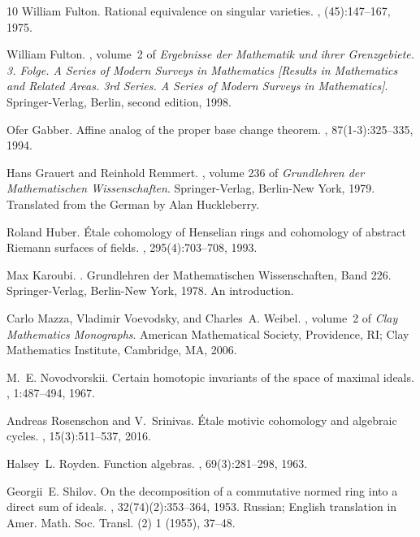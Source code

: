 \documentclass[11pt,a4paper]{amsart}
\numberwithin{equation}{section}
\theoremstyle{plain}
\theoremstyle{definition}
\theoremstyle{remark}
\begin{document}
\begin{thebibliography}{10}
William Fulton.
\newblock Rational equivalence on singular varieties.
, (45):147--167, 1975.

William Fulton.
, volume~2 of {\em Ergebnisse der Mathematik
  und ihrer Grenzgebiete. 3. Folge. A Series of Modern Surveys in Mathematics
  [Results in Mathematics and Related Areas. 3rd Series. A Series of Modern
  Surveys in Mathematics]}.
\newblock Springer-Verlag, Berlin, second edition, 1998.

Ofer Gabber.
\newblock Affine analog of the proper base change theorem.
, 87(1-3):325--335, 1994.

Hans Grauert and Reinhold Remmert.
, volume 236 of {\em Grundlehren der
  Mathematischen Wissenschaften}.
\newblock Springer-Verlag, Berlin-New York, 1979.
\newblock Translated from the German by Alan Huckleberry.

Roland Huber.
\newblock \'{E}tale cohomology of {H}enselian rings and cohomology of abstract
  {R}iemann surfaces of fields.
, 295(4):703--708, 1993.

Max Karoubi.
.
\newblock Grundlehren der Mathematischen Wissenschaften, Band 226.
  Springer-Verlag, Berlin-New York, 1978.
\newblock An introduction.

Carlo Mazza, Vladimir Voevodsky, and Charles~A. Weibel.
, volume~2 of {\em Clay
  Mathematics Monographs}.
\newblock American Mathematical Society, Providence, RI; Clay Mathematics
  Institute, Cambridge, MA, 2006.

M.~E. Novodvorskii.
\newblock Certain homotopic invariants of the space of maximal ideals.
, 1:487--494, 1967.

Andreas Rosenschon and V.~Srinivas.
\newblock \'{E}tale motivic cohomology and algebraic cycles.
, 15(3):511--537, 2016.

Halsey~L. Royden.
\newblock Function algebras.
, 69(3):281--298, 1963.

Georgii~E. Shilov.
\newblock On the decomposition of a commutative normed ring into a direct sum
  of ideals.
, 32(74)(2):353--364, 1953.
\newblock Russian; English translation in Amer. Math. Soc. Transl. (2) 1
  (1955), 37--48.


\end{thebibliography}
\end{document}
